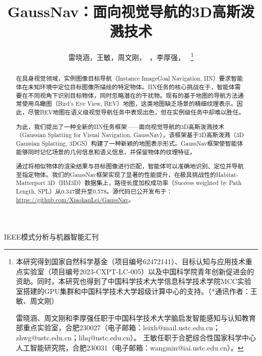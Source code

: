 \documentclass[lettersize,journal]{IEEEtran}
\begin{document}
\title{GaussNav：面向视觉导航的3D高斯泼溅技术}

\author{雷晓涵，王敏，周文刚，~，李厚强，~
\thanks{
本研究得到国家自然科学基金（项目编号62472141）、目标认知与应用技术重点实验室（项目编号2023-CXPT-LC-005）以及中国科学院青年创新促进会的资助。同时，本研究也得到了中国科学技术大学信息科学技术学院MCC实验室搭建的GPU集群和中国科学技术大学超级计算中心的支持。（*通讯作者：王敏、周文刚）

雷晓涵、周文刚和李厚强任职于中国科学技术大学脑启发智能感知与认知教育部重点实验室，合肥230027（电子邮箱：leixh@mail.ustc.edu.cn；zhwg@ustc.edu.cn；lihq@ustc.edu.cn）。
王敏任职于合肥综合性国家科学中心人工智能研究院，合肥230031（电子邮箱：wangmin@iai.ustc.edu.cn）。}%
}

{IEEE模式分析与机器智能汇刊}



\maketitle

\begin{abstract}
在具身视觉领域，实例图像目标导航（Instance ImageGoal Navigation, IIN）要求智能体在未知环境中定位目标图像所描绘的特定物体。IIN任务的核心挑战在于，智能体需要在不同视角下识别目标物体，同时忽略潜在的干扰物。现有的基于地图的导航方法通常使用鸟瞰图（Bird's Eye View, BEV）地图，这类地图缺乏场景的精细纹理表示。因此，尽管BEV地图在语义级视觉导航任务中表现出色，但在实例级任务中却难以胜任。

为此，我们提出了一种全新的IIN任务框架——面向视觉导航的3D高斯泼溅技术（Gaussian Splatting for Visual Navigation, GaussNav），该框架基于3D高斯泼溅（3D Gaussian Splatting, 3DGS）构建了一种新颖的地图表示形式。GaussNav框架使智能体能够同时记忆场景的几何信息和语义信息，并保留物体的纹理特征。

通过将相似物体的渲染结果与目标图像进行匹配，智能体可以准确地识别、定位并导航至指定物体。我们的GaussNav框架实现了显著的性能提升，在极具挑战性的Habitat-Matterport 3D（HM3D）数据集上，路径长度加权成功率（Success weighted by Path Length, SPL）从0.347提升至0.578。源代码已公开发布于：\url{https://github.com/XiaohanLei/GaussNav}。
\end{abstract}
\end{document}
